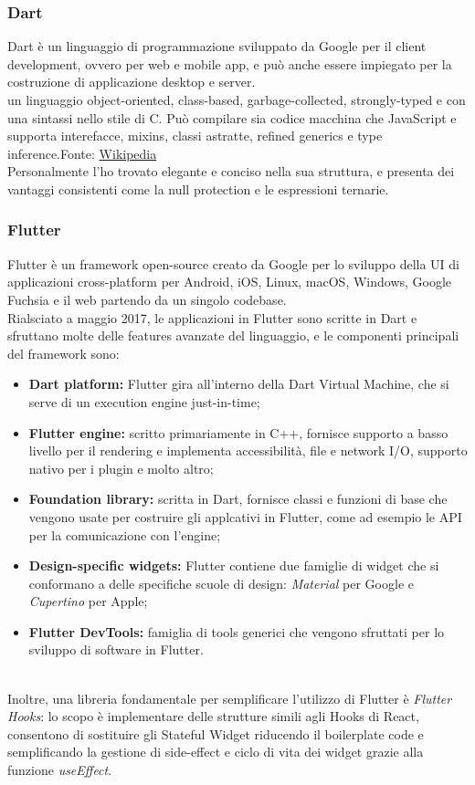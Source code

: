 \subsubsection{Dart}
Dart è un linguaggio di programmazione sviluppato da Google per il client development, ovvero per web e mobile app, e può anche essere impiegato per la costruzione di applicazione desktop e server.\\
\E{} un linguaggio object-oriented, class-based, garbage-collected, strongly-typed e con una sintassi nello stile di C. Può compilare sia codice macchina che JavaScript e supporta interefacce, mixins, classi astratte, refined generics e type inference.{\tiny Fonte: \href{https://en.wikipedia.org/wiki/Dart_(programming_language)}{Wikipedia}}\\
Personalmente l'ho trovato elegante e conciso nella sua struttura, e presenta dei vantaggi consistenti come la null protection e le espressioni ternarie.

\subsubsection{Flutter}
Flutter è un framework open-source creato da Google per lo sviluppo della UI di applicazioni cross-platform per Android, iOS, Linux, macOS, Windows, Google Fuchsia e il web partendo da un singolo codebase.\\
Rialsciato a maggio 2017, le applicazioni in Flutter sono scritte in Dart e sfruttano molte delle features avanzate del linguaggio, e le componenti principali del framework sono:
\begin{itemize}
    \item \textbf{Dart platform:} Flutter gira all'interno della Dart Virtual Machine, che si serve di un execution engine just-in-time;
    \item \textbf{Flutter engine:} scritto primariamente in C++, fornisce supporto a basso livello per il rendering e implementa accessibilità, file e network I/O, supporto nativo per i plugin e molto altro;
    \item \textbf{Foundation library:} scritta in Dart, fornisce classi e funzioni di base che vengono usate per costruire gli applcativi in Flutter, come ad esempio le API per la comunicazione con l'engine;
    \item \textbf{Design-specific widgets:} Flutter contiene due famiglie di widget che si conformano a delle specifiche scuole di design: \textit{Material} per Google e \textit{Cupertino} per Apple;
    \item \textbf{Flutter DevTools:} famiglia di tools generici che vengono sfruttati per lo sviluppo di software in Flutter.
\end{itemize}
~\\
Inoltre, una libreria fondamentale per semplificare l'utilizzo di Flutter è \textit{Flutter Hooks}: lo scopo è implementare delle strutture simili agli Hooks di React, consentono di sostituire gli Stateful Widget riducendo il boilerplate code e semplificando la gestione di side-effect e ciclo di vita dei widget grazie alla funzione \textit{useEffect}.

